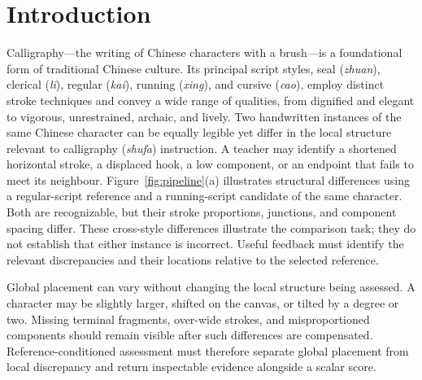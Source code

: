 \section{Introduction}
\label{sec:introduction}

Calligraphy---the writing of Chinese characters with a brush---is a
foundational form of traditional Chinese culture. Its principal script styles,
seal (\emph{zhuan}), clerical (\emph{li}), regular (\emph{kai}), running
(\emph{xing}), and cursive (\emph{cao}), employ distinct stroke techniques and
convey a wide range of qualities, from dignified and elegant to vigorous,
unrestrained, archaic, and lively. Two handwritten instances of the same
Chinese character can be equally
legible yet differ in the local structure relevant to calligraphy
(\emph{shufa}) instruction. A teacher may identify a shortened horizontal
stroke, a displaced hook, a low component, or an endpoint that fails to meet
its neighbour. Figure~\ref{fig:pipeline}(a) illustrates structural differences
using a regular-script reference and a running-script candidate of the same
character. Both are recognizable, but their stroke proportions, junctions,
and component spacing differ. These cross-style differences illustrate the
comparison task; they do not establish that either instance is incorrect.
Useful feedback must identify the relevant discrepancies and their locations
relative to the selected reference.

Global placement can vary without changing the local structure being
assessed. A character may be slightly larger, shifted on the canvas, or
tilted by a degree or two. Missing terminal fragments, over-wide strokes,
and misproportioned components should remain visible after such differences
are compensated. Reference-conditioned assessment must therefore separate
global placement from local discrepancy and return inspectable evidence
alongside a scalar score.

